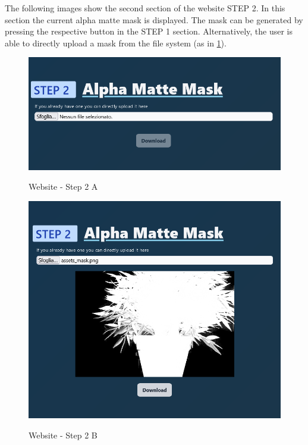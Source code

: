 \documentclass[a4paper]{article}
\begin{document}
The following images show the second section
of the website \textsc{STEP 2}.
In this section the current alpha \gls{matte} mask
is displayed. The mask can be generated by pressing
the respective button in the \textsc{STEP 1}
section. Alternatively, the user is able to
directly upload a mask from the file system
(as in \ref{fig:fig2b}).

\begin{figure}[h]
    \centering
    \begin{minipage}[b]{0.49\textwidth}
        \includegraphics[width=\textwidth]{website/step2A.png}
        \label{fig:fig2a}
        \caption{Website - Step 2 A}
    \end{minipage}
    \hfill
    \begin{minipage}[b]{0.49\textwidth}
        \includegraphics[width=\textwidth]{website/step2B.png}
        \label{fig:fig2b}
        \caption{Website - Step 2 B}
    \end{minipage}
\end{figure}
\end{document}
